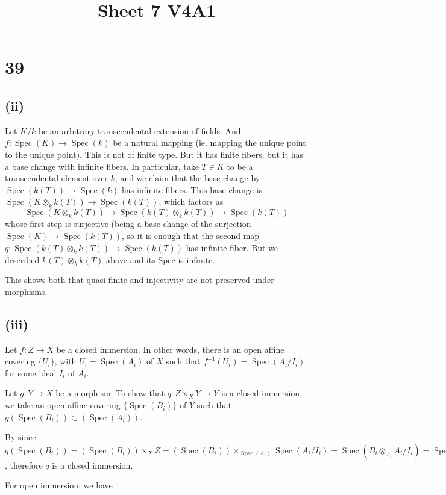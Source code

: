 \documentclass{article}
\title{Sheet 7 V4A1}
\author{}
\date{}
\numberwithin{equation}{section}
\DeclareMathOperator{\Spec}{Spec}
\begin{document}
\maketitle

\section*{39}

\subsection*{(ii)}
Let $K/k$ be an arbitrary transcendental extension of fields. And $f:\Spec(K)\to\Spec(k)$ be a natural mapping (ie. mapping the unique point to the unique point). This is not of finite type. But it has finite fibers, but it has a base change with infinite fibers. In particular, take $T\in K$ to be a transcendental element over $k$, and we claim that the base change by $\Spec(k(T))\to \Spec(k)$ has infinite fibers. This base change is $\Spec(K\otimes_kk(T))\to\Spec(k(T))$, which factors as
\begin{equation*}
\Spec(K\otimes_kk(T))\to\Spec(k(T)\otimes_kk(T))\to\Spec(k(T))
\end{equation*}
whose first step is surjective (being a base change of the surjection $\Spec(K)\to\Spec(k(T))$, so it is enough that the second map $q:\Spec(k(T)\otimes_kk(T))\to\Spec(k(T))$ has infinite fiber. But we described $k(T)\otimes_kk(T)$ above and its Spec is infinite.

This shows both that quasi-finite and injectivity are not preserved under morphisms.

\subsection*{(iii)}
Let $f:Z\to X$ be a closed immersion. In other words, there is an open affine covering $\{U_i\}$, with $U_i=\Spec(A_i)$ of $X$ such that $f^{-1}(U_i)=\Spec(A_i/I_i)$ for some ideal $I_i$ of $A_i$. \\
\par Let $g:Y\to X$ be a morphism. To show that $q:Z\times_XY\to Y$ is a closed immersion,
we take an open affine covering $\{\Spec(B_i)\}$ of $Y$ such that $g(\Spec(B_i))\subset(\Spec(A_i))$. \\
\par By since $q(\Spec(B_i)) = (\Spec(B_i))\times_XZ = (\Spec(B_i))\times_{\Spec(A_i)}\Spec(A_i/I_i) = \Spec(B_i\otimes_{A_i}A_i/I_i) = \Spec(B_i/I_iB_i)$, therefore $q$ is a closed immersion.\\
\par For open immersion, we have
\end{document}
